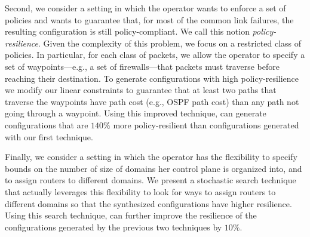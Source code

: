 Second, we consider a setting in which the operator wants to enforce a
set of policies and wants to guarantee that, for most of the common
link failures, the resulting configuration is still policy-compliant.
We call this notion \emph{policy-resilience}.  Given the complexity of
this problem, we focus on a {\rm restricted class} of policies.  In
particular, for each class of packets, we allow the operator to
specify a set of waypoints---e.g., a set of firewalls---that packets
must traverse before reaching their destination.  To generate
configurations with high policy-resilience we modify our linear
constraints to guarantee that at least two paths that traverse the
waypoints have path cost (e.g., OSPF path cost) than any path not
going through a waypoint.  Using this improved technique, \name can
generate configurations that are $140\%$ more policy-resilient than
configurations generated with our first technique.

Finally, we consider a setting in which the operator has the
flexibility to specify bounds on the number of size of domains her
control plane is organized into, and to assign routers to different
domains.  We present a stochastic search technique that actually
leverages this flexibility to look for ways to assign routers to
different domains so that the synthesized configurations have higher
resilience.  Using this search technique, \name can further improve
the resilience of the configurations generated by the previous two
techniques by $10\%$.






